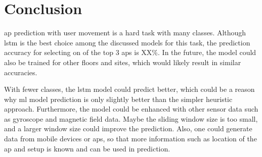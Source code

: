\chapter{Conclusion}\label{ch:conclusion}
 
\ac{ap} prediction with user movement is a hard task with many classes.
Although \ac{lstm} is the best choice among the discussed models for this task, the prediction accuracy for selecting on of the top 3 \acp{ap} is XX\%.
In the future, the model could also be trained for other floors and sites, which would likely result in similar accuracies.

With fewer classes, the \ac{lstm} model could predict better, which could be a reason why \ac{ml} model prediction is only slightly better than the simpler heuristic approach.
Furthermore, the model could be enhanced with other sensor data such as gyroscope and magnetic field data.
Maybe the sliding window size is too small, and a larger window size could improve the prediction.
Also, one could generate data from mobile devices or \acp{ap}, so that more information such as location of the \ac{ap} and setup is known and can be used in prediction.

